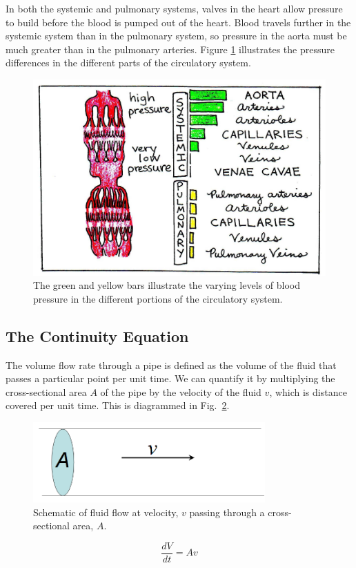 In both the systemic and pulmonary systems, valves in the heart allow pressure to build before the blood is pumped out of the heart.  Blood travels further in the systemic system than in the pulmonary system, so pressure in the aorta must be much greater than in the pulmonary arteries.  Figure \ref{Fig2-4} illustrates the pressure differences in the different parts of the circulatory system.
\begin{figure}[htb]
	\centering
	\includegraphics[width=\textwidth]{./figures/Topic2/Fig2-4.jpg}
	\caption{The green and yellow bars illustrate the varying levels of blood pressure in the different portions of the circulatory system.}
	\label{Fig2-4}
\end{figure}

\subsection{The Continuity Equation}

The volume flow rate through a pipe is defined as the volume of the fluid that passes a particular point per unit time.  We can quantify it by multiplying the cross-sectional area $A$ of the pipe by the velocity of the fluid $v$, which is distance covered per unit time. This is diagrammed in Fig.~\ref{Fig2-5}.
\begin{figure}[htb]
	\centering
	\includegraphics[width=3.5in]{./figures/Topic2/Fig2-5.png}
	\caption{Schematic of fluid flow at velocity, $v$ passing through a cross-sectional area, $A$.}
	\label{Fig2-5}
\end{figure}
\begin{equation}\label{eqn2-1}
\frac{dV}{dt} = Av
\end{equation}

